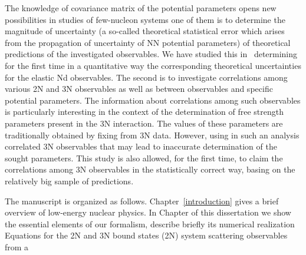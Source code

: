 The knowledge of covariance matrix of the potential parameters opens new 
possibilities in studies of few-nucleon systems one of them is to determine the 
magnitude of uncertainty (a so-called theoretical statistical error which 
arises from the propagation of uncertainty of NN potential parameters) of 
theoretical predictions of the investigated observables. We have studied this 
in~\cite{Skibinski2018} determining for the first time in a quantitative way 
the corresponding theoretical uncertainties for the elastic Nd observables. The 
second is to investigate correlations among various 2N and 3N observables as 
well as between observables and specific potential parameters. The information 
about correlations among such observables is particularly interesting in the 
context of the determination of free strength parameters present in the 3N 
interaction. The values of these parameters are traditionally obtained by 
fixing from 3N data. However, using in such an analysis correlated 3N 
observables that may lead to inaccurate determination of the sought parameters. 
This study is also allowed, for the first time, to claim the correlations among 
3N observables in the statistically correct way, basing on the relatively big 
sample of predictions. 

The manuscript is organized as follows. Chapter~\ref{introduction} gives a 
brief overview of low-energy nuclear physics. In Chapter of this dissertation 
we show the essential elements of our formalism, describe briefly its numerical 
realization Equations for the 2N and 3N bound states
(2N) system
%
scattering observables from a
